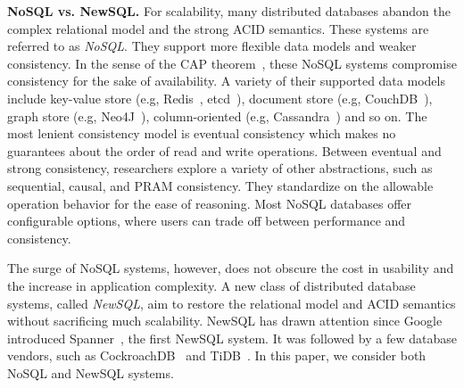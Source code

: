 \textbf{NoSQL vs. NewSQL.}
For scalability, many distributed databases abandon the complex relational model
and the strong ACID semantics.
These systems are referred to as {\em NoSQL}. They support more flexible data
models and weaker consistency.
In the sense of the CAP theorem~\cite{gilbert2012perspectives}, these NoSQL
systems compromise consistency for the sake of availability.
A variety of their supported data models include key-value store (e.g,
Redis~\cite{carlson2013redis}, etcd~\cite{web:etcd}), document store (e.g,
CouchDB~\cite{anderson2010couchdb}), graph store (e.g,
Neo4J~\cite{vukotic2014neo4j}), column-oriented (e.g,
Cassandra~\cite{lakshman2010cassandra}) and so on.
The most lenient consistency model is eventual consistency which makes no
guarantees about the order of read and write operations.
Between eventual and strong consistency, researchers explore a variety of other
abstractions, such as sequential, causal, and PRAM consistency. They standardize
on the allowable operation behavior for the ease of reasoning.
Most NoSQL databases offer configurable options, where users can trade off
between performance and consistency.

The surge of NoSQL systems, however, does not obscure the cost in usability and
the increase in application complexity.  A new class of distributed database
systems, called {\em NewSQL}, aim to restore the relational model and ACID
semantics without sacrificing much scalability.
NewSQL has drawn attention since Google introduced
Spanner~\cite{corbett2013spanner}, the first NewSQL system. It was followed by a
few database vendors, such as CockroachDB~\cite{web:cockroach} and
TiDB~\cite{web:tidb}. In this paper, we consider both NoSQL and NewSQL systems.

